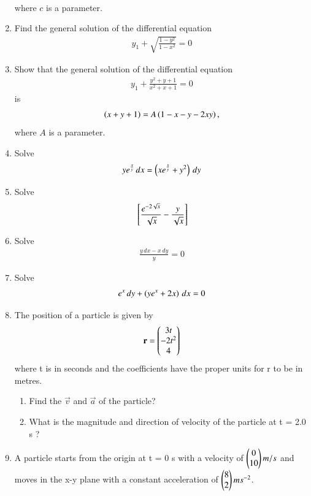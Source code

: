 \begin{enumerate}[label=\arabic*.,ref=\thesubsection.\theenumi]
\begin{align}
\end{align}
%
where $c$ is a parameter.
%
\item Find the general solution of the differential equation
%
\begin{align}
y_1 +\sqrt{\frac{1-y^2}{1-x^2}} = 0
\end{align}
%
\item Show that the general solution of the differential equation
%
\begin{align}
y_1 +\frac{y^2+y+1}{x^2+x+1} = 0
\end{align}
%
is 
%
\begin{align}
\left(x+y+1\right) = A\left(1-x-y-2xy\right), 
\end{align}
%
where $A$ is a parameter.
\item Solve
%
\begin{align}
ye^{\frac{x}{y}}\, dx = \left(xe^{\frac{x}{y}}+y^2\right)\, dy
\end{align}
%
\item Solve
%
\begin{align}
{}\left[
\frac{
e^{-2\sqrt{x}}
}
{
\sqrt{x}
}
-
\frac{y}{\sqrt{x}}
\right]
\end{align}
%
%
\item Solve
%
\begin{align}
\frac{y\, dx - x \, dy}{y} = 0
\end{align}
%
\item Solve
%
\begin{align}
e^{x}\, dy + \left(ye^{x}+2x\right)\, dx = 0
\end{align}
\item The position of a particle is given by 
\begin{align}
\mathbf{r} = \begin{pmatrix}3t \\-2t^2\\4\end{pmatrix}
\end{align}
where t is in seconds and the coefficients have the proper units for r to be in metres. 
\begin{enumerate}
\item  Find the $\vec{v}$ and $\vec{a}$ of the particle? 
\item  What is the magnitude and direction of velocity of the particle at t = 2.0 s ?
\end{enumerate}
\item A particle starts from the origin at t = 0 s with a velocity of $\begin{pmatrix}0\\10\end{pmatrix} m/s$ and moves in the x-y plane with a constant acceleration of $\begin{pmatrix}8\\2\end{pmatrix}ms^{-2}$.

\end{enumerate}
